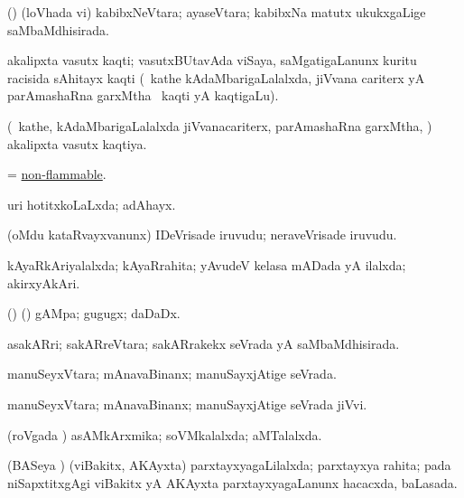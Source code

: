 \bentry
{}
\gl{\gu}
\bmng
(\ravi) (loVhada vi) kabibxNeVtara; ayaseVtara; kabibxNa matutx ukukxgaLige saMbaMdhisirada. 
\emng
\eentry

\bentry
{}
\gl{\nA}
\bmng
akalipxta vasutx kaqti; vasutxBUtavAda viSaya, saMgatigaLanunx kuritu racisida sAhitayx kaqti (\kanmu\ kathe kAdaMbarigaLalalxda, jiVvana cariterx yA parAmashaRna garxMtha \mo\ kaqti yA kaqtigaLu). 
\emng
\eentry


\bentry
{}
\gl{\gu}
\bmng
(\kanmu\ kathe, kAdaMbarigaLalalxda jiVvanacariterx, parAmashaRna garxMtha, \mo) akalipxta vasutx kaqtiya. 
\emng
\eentry

\bentry
{}
\gl{\gu}
\bmng
= \hyperlink{non-flammable}{non-flammable}. 
\emng
\eentry

\bentry
{}
\gl{\gu}
\bmng
uri hotitxkoLaLxda; adAhayx. 
\emng
\eentry

\bentry
{}
\gl{\nA}
\bmng
(oMdu kataRvayxvanunx) IDeVrisade iruvudu; neraveVrisade iruvudu. 
\emng
\eentry

\bentry
{}
\gl{\gu}
\bmng
kAyaRkAriyalalxda; kAyaRrahita; yAvudeV kelasa mADada yA ilalxda; akirxyAkAri. 
\emng
\eentry

\bentry
{}
\gl{\nA}
\bmng
(\AseTxrXV) (\ashi) gAMpa; gugugx; daDaDx. 
\emng
\eentry

\bentry
{}
\gl{\gu}
\bmng
asakARri; sakARreVtara; sakARrakekx seVrada yA saMbaMdhisirada. 
\emng
\eentry

\bentry
{}
\gl{\gu}
\bmng
manuSeyxVtara; mAnavaBinanx; manuSayxjAtige seVrada. 
\emng
\eentry

\bentry
{}
\gl{\nA}
\bmng
manuSeyxVtara; mAnavaBinanx; manuSayxjAtige seVrada jiVvi. 
\emng
\eentry

\bentry
{}
\gl{\gu}
\bmng
(roVgada \vi) asAMkArxmika; soVMkalalxda; aMTalalxda. 
\emng
\eentry

\bentry
{}
\gl{\gu}
\bmng
(BASeya \vi) (viBakitx, AKAyxta) parxtayxyagaLilalxda; parxtayxya rahita; pada niSapxtitxgAgi viBakitx yA AKAyxta parxtayxyagaLanunx hacacxda, baLasada. 
\emng
\eentry

